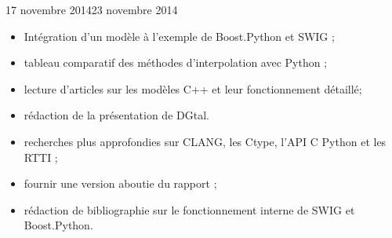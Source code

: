 \documentclass[11pt, french, screen]{report-rd-info}
\begin{document}
\begin{fichesuivi}{17 novembre 2014}{23 novembre 2014}

	\begin{travaileffectue}
	    \begin{itemize}
	        \item Intégration d'un modèle à l'exemple de Boost.Python et SWIG ;
            \item tableau comparatif des méthodes d'interpolation avec Python ;
            \item lecture d'articles sur les modèles C++ et leur fonctionnement détaillé;
            \item rédaction de la présentation de DGtal.
	    \end{itemize}
	\end{travaileffectue}

	\begin{travailnoneffectue}
	\end{travailnoneffectue}

	\begin{echange}
	\end{echange}

	\begin{planification}
	    \begin{itemize}
	        \item recherches plus approfondies sur CLANG, les Ctype, l'API C Python et les RTTI ;
            \item fournir une version aboutie du rapport ;
            \item rédaction de bibliographie sur le fonctionnement interne de SWIG et Boost.Python.
	    \end{itemize}
	\end{planification}
\end{fichesuivi}
\end{document}
